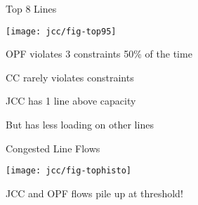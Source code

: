 \begin{frame}{Top 8 Lines}
\vspace{-15pt}
\begin{center}
\texttt{[image: jcc/fig-top95]}
\end{center}
\vspace{-5pt}
\bi
\item OPF violates 3 constraints 50\% of the time
\item CC rarely violates constraints
\item JCC has 1 line above capacity
\bi
\item But has less loading on other lines
\ei
\ei

\end{frame}
\begin{frame}{Congested Line Flows}
\vspace{-7pt}
\begin{center}
\texttt{[image: jcc/fig-tophisto]}
\end{center}
\vspace{-10pt}
\bi
\item JCC and OPF flows pile up at threshold!
\ei
\end{frame}




